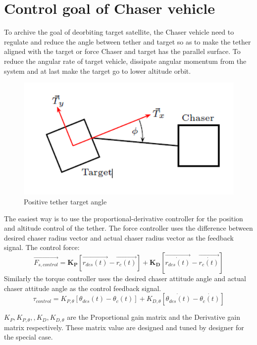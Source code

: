 \section{Control goal of Chaser vehicle}
To archive the goal of deorbiting target satellite, the Chaser vehicle need to regulate and reduce the angle between tether and target so as to make the tether aligned with the target or force Chaser and target has the parallel surface. To reduce the angular rate of target vehicle, dissipate angular momentum from the system and at last make the target go to lower altitude orbit.
\begin{figure}
\centering
\includegraphics{fig/simulation/TetherTargetAngle}
\caption{Positive tether target angle~\cite{hovell2017experimental}}
\end{figure}
The easiest way is to use the proportional-derivative controller for the position and altitude control of the tether.
The force controller uses the difference between desired chaser radius vector and actual chaser radius vector as the feedback signal. The control force:  
\begin{equation}
\overrightarrow{F_{s,control}} = \mathbf{K_P}\left[\overrightarrow{r_{des}(t)}-\overrightarrow{r_c(t)}\right]+\mathbf{K_D}\left[\overrightarrow{\dot{r_{des}(t)}}-\overrightarrow{\dot{r_c(t)}}\right]
\end{equation}
Similarly the torque controller uses the desired chaser attitude angle and actual chaser attitude angle as the control feedback signal.
\begin{equation}
\tau_{control} =K_{P,\theta}\left[\theta_{des}(t)-\theta_c(t)\right] + K_{D,\theta}\left[\dot{\theta_{des}(t)}-\dot{\theta_c(t)}\right]
\end{equation}

$K_P,K_{P,\theta},, K_D,K_{D,\theta}$ are the Proportional gain matrix and the Derivative gain matrix respectively. These matrix value are designed and tuned by designer for the special case.

